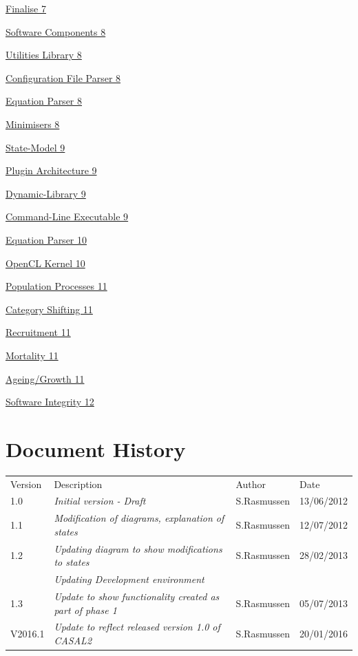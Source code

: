 \documentclass[a4paper,11pt,twoside,pdftex,draft]{article}
\begin{document}
\protect\hyperlink{finalise}{Finalise 7}

\protect\hyperlink{software-components}{Software Components 8}

\protect\hyperlink{utilities-library}{Utilities Library 8}

\protect\hyperlink{configuration-file-parser}{Configuration File Parser
8}

\protect\hyperlink{__RefHeading__689_571873561}{Equation Parser 8}

\protect\hyperlink{minimisers}{Minimisers 8}

\protect\hyperlink{__RefHeading__693_571873561}{State-Model 9}

\protect\hyperlink{plugin-architecture}{Plugin Architecture 9}

\protect\hyperlink{dynamic-library}{Dynamic-Library 9}

\protect\hyperlink{command-line-executable}{Command-Line Executable 9}

\protect\hyperlink{equation-parser}{Equation Parser 10}

\protect\hyperlink{__RefHeading__681_571873561}{OpenCL Kernel 10}

\protect\hyperlink{population-processes}{Population Processes 11}

\protect\hyperlink{category-shifting}{Category Shifting 11}

\protect\hyperlink{recruitment}{Recruitment 11}

\protect\hyperlink{mortality}{Mortality 11}

\protect\hyperlink{ageinggrowth}{Ageing/Growth 11}

\protect\hyperlink{software-integrity}{Software Integrity 12}

\hypertarget{document-history}{%
\section{Document History}\label{document-history}}

\begin{longtable}[]{@{}llll@{}}
\toprule
\endhead
Version & Description & Author & Date\tabularnewline
1.0 & \emph{Initial version - Draft} & S.Rasmussen &
13/06/2012\tabularnewline
1.1 & \emph{Modification of diagrams, explanation of states} &
S.Rasmussen & 12/07/2012\tabularnewline
1.2 & \emph{Updating diagram to show modifications to states} &
S.Rasmussen & 28/02/2013\tabularnewline
& \emph{Updating Development environment} & &\tabularnewline
1.3 & \emph{Update to show functionality created as part of phase 1} &
S.Rasmussen & 05/07/2013\tabularnewline
V2016.1 & \emph{Update to reflect released version 1.0 of CASAL2} &
S.Rasmussen & 20/01/2016\tabularnewline
\bottomrule
\end{longtable}
\end{document}
